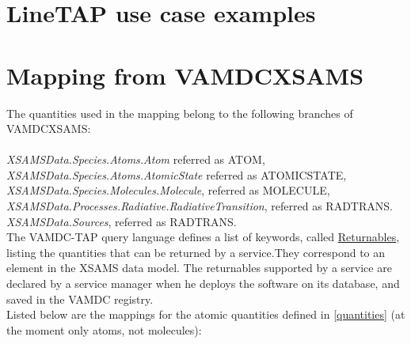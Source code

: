 \documentclass[11pt,a4paper]{ivoa}
\begin{document}


\section{LineTAP use case examples}


\section{Mapping from VAMDCXSAMS}

The quantities used in the mapping belong to the following branches of VAMDCXSAMS:\\\\
\textit{XSAMSData.Species.Atoms.Atom}  referred as ATOM,\\
\textit{XSAMSData.Species.Atoms.AtomicState}  referred as ATOMICSTATE,\\
\textit{XSAMSData.Species.Molecules.Molecule}, referred as MOLECULE,\\
\textit{XSAMSData.Processes.Radiative.RadiativeTransition}, referred as RADTRANS.\\
\textit{XSAMSData.Sources}, referred as RADTRANS.\\


The VAMDC-TAP query language defines a list of keywords, called
\href{https://standards.vamdc.eu/dictionary/returnables.html}{Returnables},
listing the quantities that can be returned by a service.They correspond
to an element in the XSAMS data model. The returnables supported by a
service are declared by a service manager when he deploys the software
on its database, and saved in the VAMDC registry. \\

Listed below are the mappings for the atomic quantities defined in
\ref{quantities} (at the moment only atoms, not molecules):
\end{document}
